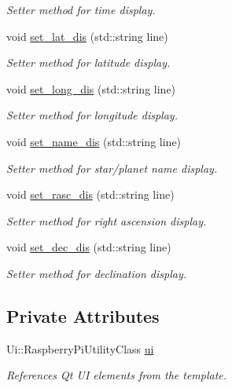 \begin{DoxyCompactItemize}
\begin{DoxyCompactList}\small\item\em Setter method for time display. \end{DoxyCompactList}\item 
void \mbox{\hyperlink{classTelescopeUI_aaf63d404f0d3ca0aaa53d8319255ac32}{set\+\_\+lat\+\_\+dis}} (std\+::string line)
\begin{DoxyCompactList}\small\item\em Setter method for latitude display. \end{DoxyCompactList}\item 
void \mbox{\hyperlink{classTelescopeUI_a17bbaf5bd8d520f6db7ccff5d20e2b15}{set\+\_\+long\+\_\+dis}} (std\+::string line)
\begin{DoxyCompactList}\small\item\em Setter method for longitude display. \end{DoxyCompactList}\item 
void \mbox{\hyperlink{classTelescopeUI_ae2e354a53baf9ad21263e0123b47785a}{set\+\_\+name\+\_\+dis}} (std\+::string line)
\begin{DoxyCompactList}\small\item\em Setter method for star/planet name display. \end{DoxyCompactList}\item 
void \mbox{\hyperlink{classTelescopeUI_a9af61f40fd39d3c22ecd349a038ef2b5}{set\+\_\+rasc\+\_\+dis}} (std\+::string line)
\begin{DoxyCompactList}\small\item\em Setter method for right ascension display. \end{DoxyCompactList}\item 
void \mbox{\hyperlink{classTelescopeUI_a783632af5cec9a781f0228204b7d4126}{set\+\_\+dec\+\_\+dis}} (std\+::string line)
\begin{DoxyCompactList}\small\item\em Setter method for declination display. \end{DoxyCompactList}\end{DoxyCompactItemize}
\subsection*{Private Attributes}
\begin{DoxyCompactItemize}
\item 
\mbox{\label{classTelescopeUI_ac00c9f2b983cbb014fb21e4a9f5e76c9}} 
Ui\+::\+Raspberry\+Pi\+Utility\+Class \mbox{\hyperlink{classTelescopeUI_ac00c9f2b983cbb014fb21e4a9f5e76c9}{ui}}
\begin{DoxyCompactList}\small\item\em References Qt UI elements from the template. \end{DoxyCompactList}\end{DoxyCompactItemize}


